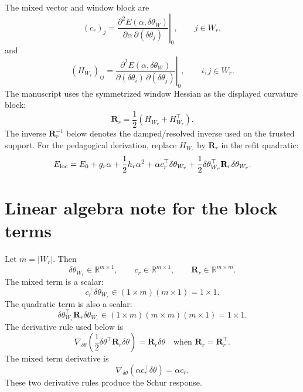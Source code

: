 \documentclass[10pt,twocolumn]{article}
\newcommand{\R}{\mathbb R}
\begin{document}
The mixed vector and window block are
\begin{equation}
(c_r)_j
=
\left.
\frac{\partial^2E(\alpha,\delta\theta_W)}
{\partial\alpha\,\partial(\delta\theta_j)}
\right|_0,
\qquad j\in W_r,
\label{eq:c_r_def_paper}
\end{equation}
and
\begin{equation}
(H_{W_r})_{ij}
=
\left.
\frac{\partial^2E(\alpha,\delta\theta_W)}
{\partial(\delta\theta_i)\,\partial(\delta\theta_j)}
\right|_0,
\qquad i,j\in W_r.
\label{eq:HWr_def_paper}
\end{equation}
The manuscript uses the symmetrized window Hessian as the displayed curvature block:
\begin{equation}
\mathbf R_r
=
\frac12(H_{W_r}+H_{W_r}^\top).
\label{eq:Rr_def_paper}
\end{equation}
The inverse \(\mathbf R_r^{-1}\) below denotes the damped/resolved inverse used on the trusted support. For the pedagogical derivation, replace \(H_{W_r}\) by \(\mathbf R_r\) in the refit quadratic:
\begin{equation}
E_{\rm loc}
=E_0+g_r\alpha+\frac12h_r\alpha^2
+\alpha c_r^\top\delta\theta_{W_r}
+\frac12\delta\theta_{W_r}^\top \mathbf R_r\delta\theta_{W_r}.
\label{eq:regularized_local_model}
\end{equation}

\section{Linear algebra note for the block terms}

Let \(m=|W_r|\). Then
\begin{equation}
\delta\theta_{W_r}\in\R^{m\times1},
\qquad
c_r\in\R^{m\times1},
\qquad
\mathbf R_r\in\R^{m\times m}.
\label{eq:block_dimensions}
\end{equation}
The mixed term is a scalar:
\begin{equation}
c_r^\top\delta\theta_{W_r}
\in(1\times m)(m\times1)=1\times1.
\label{eq:mixed_scalar}
\end{equation}
The quadratic term is also a scalar:
\begin{equation}
\delta\theta_{W_r}^\top \mathbf R_r\delta\theta_{W_r}
\in(1\times m)(m\times m)(m\times1)=1\times1.
\label{eq:quad_scalar}
\end{equation}
The derivative rule used below is
\begin{equation}
\nabla_{\delta\theta}
\left(
\frac12\delta\theta^\top\mathbf R_r\delta\theta
\right)
=\mathbf R_r\delta\theta
\quad\text{when }\mathbf R_r=\mathbf R_r^\top.
\label{eq:quad_derivative_rule}
\end{equation}
The mixed term derivative is
\begin{equation}
\nabla_{\delta\theta}
\left(\alpha c_r^\top\delta\theta\right)
=\alpha c_r.
\label{eq:mixed_derivative_rule}
\end{equation}
These two derivative rules produce the Schur response.
\end{document}
